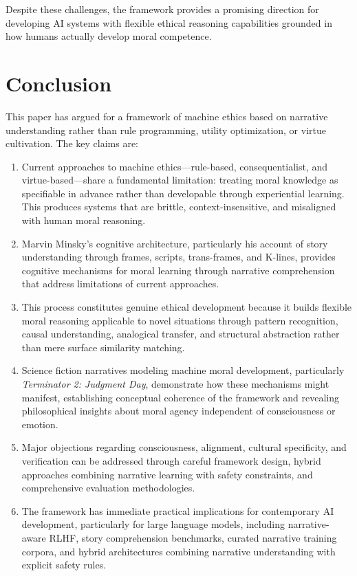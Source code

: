 \documentclass[12pt]{article}
\begin{document}
Despite these challenges, the framework provides a promising direction for developing AI systems with flexible ethical reasoning capabilities grounded in how humans actually develop moral competence.

\section{Conclusion}

This paper has argued for a framework of machine ethics based on narrative understanding rather than rule programming, utility optimization, or virtue cultivation. The key claims are:

\begin{enumerate}
\item Current approaches to machine ethics---rule-based, consequentialist, and virtue-based---share a fundamental limitation: treating moral knowledge as specifiable in advance rather than developable through experiential learning. This produces systems that are brittle, context-insensitive, and misaligned with human moral reasoning.

\item Marvin Minsky's cognitive architecture, particularly his account of story understanding through frames, scripts, trans-frames, and K-lines, provides cognitive mechanisms for moral learning through narrative comprehension that address limitations of current approaches.

\item This process constitutes genuine ethical development because it builds flexible moral reasoning applicable to novel situations through pattern recognition, causal understanding, analogical transfer, and structural abstraction rather than mere surface similarity matching.

\item Science fiction narratives modeling machine moral development, particularly \textit{Terminator 2: Judgment Day}, demonstrate how these mechanisms might manifest, establishing conceptual coherence of the framework and revealing philosophical insights about moral agency independent of consciousness or emotion.

\item Major objections regarding consciousness, alignment, cultural specificity, and verification can be addressed through careful framework design, hybrid approaches combining narrative learning with safety constraints, and comprehensive evaluation methodologies.

\item The framework has immediate practical implications for contemporary AI development, particularly for large language models, including narrative-aware RLHF, story comprehension benchmarks, curated narrative training corpora, and hybrid architectures combining narrative understanding with explicit safety rules.
\end{enumerate}
\end{document}
